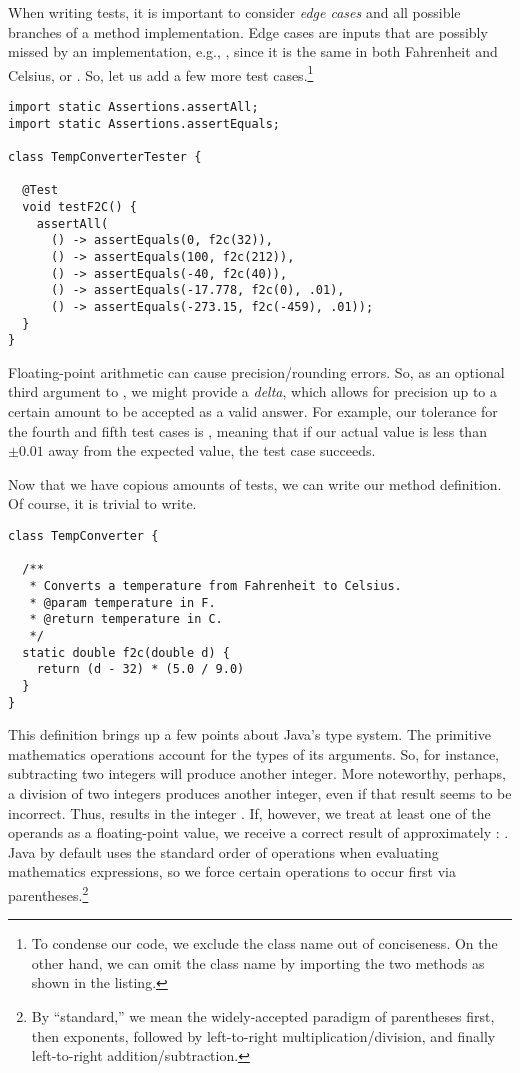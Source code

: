 When writing tests, it is important to consider \emph{edge cases} and all possible branches of a method implementation. Edge cases are inputs that are possibly missed by an implementation, e.g., , since it is the same in both Fahrenheit and Celsius, or . So, let us add a few more test cases.\footnote{To condense our code, we exclude the  class name out of conciseness. On the other hand, we can omit the  class name by importing the two methods as shown in the listing.}

\begin{lstlisting}[language=MyJava]
import static Assertions.assertAll;
import static Assertions.assertEquals;

class TempConverterTester {

  @Test
  void testF2C() {
    assertAll(
      () -> assertEquals(0, f2c(32)),
      () -> assertEquals(100, f2c(212)),
      () -> assertEquals(-40, f2c(40)),
      () -> assertEquals(-17.778, f2c(0), .01),
      () -> assertEquals(-273.15, f2c(-459), .01));
  }
}
\end{lstlisting}

Floating-point arithmetic can cause precision/rounding errors. So, as an optional third argument to , we might provide a \emph{delta}, which allows for precision up to a certain amount to be accepted as a valid answer. For example, our tolerance for the fourth and fifth test cases is , meaning that if our actual value is less than $\pm 0.01$ away from the expected value, the test case succeeds.

Now that we have copious amounts of tests, we can write our method definition. Of course, it is trivial to write.

\begin{lstlisting}[language=MyJava]
class TempConverter {

  /**
   * Converts a temperature from Fahrenheit to Celsius.
   * @param temperature in F.
   * @return temperature in C.
   */
  static double f2c(double d) {
    return (d - 32) * (5.0 / 9.0)
  }
}
\end{lstlisting}

This definition brings up a few points about Java's type system. The primitive mathematics operations account for the types of its arguments. So, for instance, subtracting two integers will produce another integer. More noteworthy, perhaps, a division of two integers produces another integer, even if that result seems to be incorrect. Thus,  results in the integer . If, however, we treat at least one of the operands as a floating-point value, we receive a correct result of approximately : . Java by default uses the standard order of operations when evaluating mathematics expressions, so we force certain operations to occur first via parentheses.\footnote{By ``standard,'' we mean the widely-accepted paradigm of parentheses first, then exponents, followed by left-to-right multiplication/division, and finally left-to-right addition/subtraction.}

